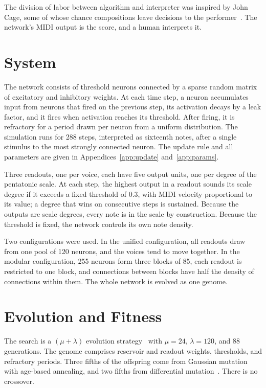 \documentclass[conference]{IEEEtran}
\begin{document}
The division of labor between algorithm and interpreter was inspired by John Cage, some of whose chance compositions leave decisions to the performer~\cite{pritchett1993}. The network's MIDI output is the score, and a human interprets it.

\section{System}

The network consists of threshold neurons connected by a sparse random matrix of excitatory and inhibitory weights. At each time step, a neuron accumulates input from neurons that fired on the previous step, its activation decays by a leak factor, and it fires when activation reaches its threshold. After firing, it is refractory for a period drawn per neuron from a uniform distribution. The simulation runs for 288 steps, interpreted as sixteenth notes, after a single stimulus to the most strongly connected neuron. The update rule and all parameters are given in Appendices~\ref{app:update} and~\ref{app:params}.

Three readouts, one per voice, each have five output units, one per degree of the pentatonic scale. At each step, the highest output in a readout sounds its scale degree if it exceeds a fixed threshold of 0.3, with MIDI velocity proportional to its value; a degree that wins on consecutive steps is sustained. Because the outputs are scale degrees, every note is in the scale by construction. Because the threshold is fixed, the network controls its own note density.

Two configurations were used. In the unified configuration, all readouts draw from one pool of 120 neurons, and the voices tend to move together. In the modular configuration, 255 neurons form three blocks of 85, each readout is restricted to one block, and connections between blocks have half the density of connections within them. The whole network is evolved as one genome.

\section{Evolution and Fitness}

The search is a $(\mu+\lambda)$ evolution strategy~\cite{beyer2002} with $\mu = 24$, $\lambda = 120$, and 88 generations. The genome comprises reservoir and readout weights, thresholds, and refractory periods. Three fifths of the offspring come from Gaussian mutation with age-based annealing, and two fifths from differential mutation~\cite{storn1997}. There is no crossover.
\end{document}
